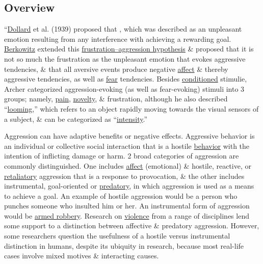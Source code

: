 \documentclass[oneside]{book}
\numberwithin{equation}{section}
\begin{document}
\subsection{Overview}
``\href{https://en.wikipedia.org/wiki/John_Dollard}{Dollard} et al. (1939) proposed that , which was described as an unpleasant emotion resulting from any interference with achieving a rewarding goal. \href{https://en.wikipedia.org/wiki/Leonard\_Berkowitz}{Berkowitz} extended this \href{https://en.wikipedia.org/wiki/Frustration%E2%80%93aggression_hypothesis}{frustration--aggression hypothesis} \& proposed that it is not so much the frustration as the unpleasant emotion that evokes aggressive tendencies, \& that all aversive events produce negative \href{https://en.wikipedia.org/wiki/Affect_(psychology)}{affect} \& thereby aggressive tendencies, as well as \href{https://en.wikipedia.org/wiki/Fear}{fear} tendencies. Besides \href{https://en.wikipedia.org/wiki/Classical_conditioning}{conditioned} stimulie, Archer categorized aggression-evoking (as well as fear-evoking) stimuli into 3 groups; namely, \href{https://en.wikipedia.org/wiki/Pain}{pain}, \href{https://en.wikipedia.org/wiki/Novelty}{novelty}, \& frustration, although he also described ``\href{https://en.wikipedia.org/wiki/Looming}{looming},'' which refers to an object rapidly moving towards the visual sensors of a subject, \& can be categorized as ``\href{https://en.wikipedia.org/wiki/Intensity_(physics)}{intensity}.''

Aggression can have adaptive benefits or negative effects. Aggressive behavior is an individual or collective social interaction that is a hostile \href{https://en.wikipedia.org/wiki/Behavior}{behavior} with the intention of inflicting damage or harm. 2 broad categories of aggression are commonly distinguished. One includes \href{https://en.wikipedia.org/wiki/Affective}{affect} (emotional) \& hostile, reactive, or \href{https://en.wikipedia.org/wiki/Revenge}{retaliatory} aggression that is a response to provocation, \& the other includes instrumental, goal-oriented or \href{https://en.wikipedia.org/wiki/Predatory}{predatory}, in which aggression is used as a means to achieve a goal. An example of hostile aggression would be a person who punches someone who insulted him or her. An instrumental form of aggression would be \href{https://en.wikipedia.org/wiki/Armed_robbery}{armed robbery}. Research on \href{https://en.wikipedia.org/wiki/Violence}{violence} from a range of disciplines lend some support to a distinction between affective \& predatory aggression. However, some researchers question the usefulness of a hostile versus instrumental distinction in humans, despite its ubiquity in research, because most real-life cases involve mixed motives \&  interacting causes.
\end{document}
